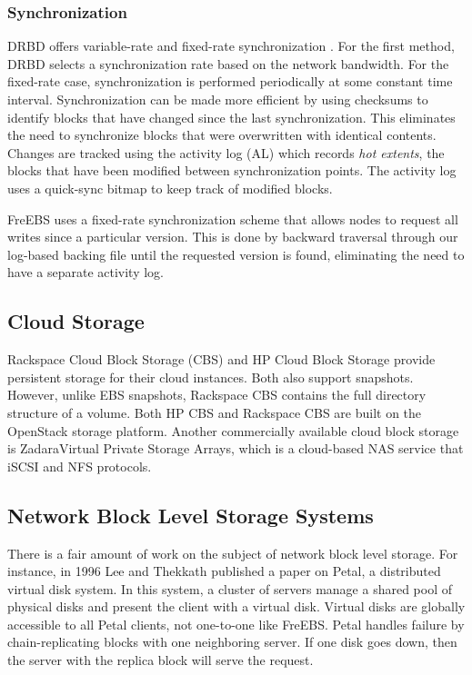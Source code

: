 \subsubsection{Synchronization} 
DRBD\textsuperscript{\textregistered} offers 
variable-rate and fixed-rate synchronization \cite{drbd_manual}.
For the first method, DRBD\textsuperscript{\textregistered} selects a 
synchronization rate
based on the network bandwidth. For the fixed-rate case, synchronization is
performed periodically at some constant time interval. Synchronization 
can be made more efficient by using checksums to identify blocks that have 
changed since the last synchronization. This eliminates the need to 
synchronize blocks that were overwritten with identical contents. Changes
are tracked using the activity log (AL) which records \emph{hot extents}, 
the blocks that have been modified between synchronization points. The 
activity log uses a quick-sync bitmap to keep track of modified blocks.

FreEBS uses a fixed-rate synchronization scheme that allows nodes to request 
all writes since a particular version. This is done by backward traversal 
through our log-based backing file until the requested version is found, 
eliminating the need to have a separate activity log.


\subsection{Cloud Storage}
Rackspace Cloud Block Storage (CBS) and HP Cloud Block Storage provide 
persistent storage for their cloud instances\cite{rackspace, hp}. Both also 
support snapshots. However, unlike EBS snapshots, Rackspace CBS contains the 
full directory structure of a volume. Both HP CBS and Rackspace CBS are 
built on the OpenStack storage platform. Another commercially available 
cloud block storage is Zadara\texttrademark Virtual Private Storage 
Arrays\cite{zadara}, which is a cloud-based NAS service that iSCSI and NFS 
protocols.  

\subsection{Network Block Level Storage Systems}
There is a fair amount of work on the subject of network block level storage.
For instance, in 1996 Lee and Thekkath published a paper on Petal, a 
distributed virtual disk system\cite{lee1996petal}. In this system, a cluster
of servers manage a shared pool of physical disks and present the client 
with a virtual disk. Virtual disks are globally accessible to all
Petal clients, not one-to-one like FreEBS. Petal handles failure by 
chain-replicating blocks with one neighboring server. If one disk goes down,
then the server with the replica block will serve the request. 


